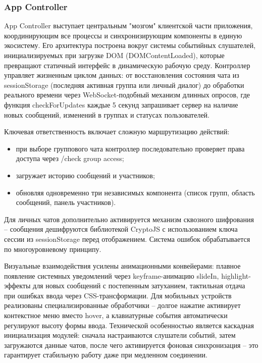 \subsubsection{App Controller}
App Controller выступает центральным "мозгом" клиентской части приложения, координирующим все процессы и синхронизирующим компоненты в единую экосистему. Его архитектура построена вокруг системы событийных слушателей, инициализируемых при загрузке DOM (DOMContentLoaded), которые превращают статичный интерфейс в динамическую рабочую среду. Контроллер управляет жизненным циклом данных: от восстановления состояния чата из sessionStorage (последняя активная группа или личный диалог) до обработки реального времени через WebSocket-подобный механизм длинных опросов, где функция checkForUpdates каждые 5 секунд запрашивает сервер на наличие новых сообщений, изменений в группах и статусах пользователей.

Ключевая ответственность включает сложную маршрутизацию действий: 
\begin{itemize}
	\item при выборе группового чата контроллер последовательно проверяет права доступа через /check group access;
	\item загружает историю сообщений и участников;
	\item обновляя одновременно три независимых компонента (список групп, область сообщений, панель участников). 
\end{itemize}	
Для личных чатов дополнительно активируется механизм сквозного шифрования – сообщения дешифруются библиотекой CryptoJS с использованием ключа сессии из sessionStorage перед отображением. Система ошибок обрабатывается по многоуровневому принципу.

Визуальные взаимодействия усилены анимационными конвейерами: плавное появление системных уведомлений через keyframe-анимацию slideIn, highlight-эффекты для новых сообщений с постепенным затуханием, тактильная отдача при ошибках ввода через CSS-трансформации. Для мобильных устройств реализованы специализированные обработчики – долгое нажатие активирует контекстное меню вместо hover, а клавиатурные события автоматически регулируют высоту формы ввода. Технической особенностью является каскадная инициализация модулей: сначала настраиваются слушатели событий, затем загружаются данные чатов, после чего активируется фоновая синхронизация – это гарантирует стабильную работу даже при медленном соединении.

